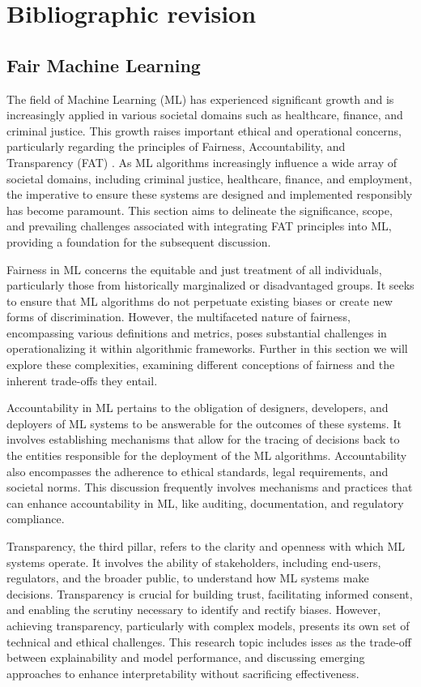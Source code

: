 
\chapter{Bibliographic revision}

\section{Fair Machine Learning}

The field of Machine Learning (ML) has experienced significant growth and is increasingly applied in various societal domains such as healthcare, finance, and criminal justice. This growth raises important ethical and operational concerns, particularly regarding the principles of Fairness, Accountability, and Transparency (FAT) \citep{}. As ML algorithms increasingly influence a wide array of societal domains, including criminal justice, healthcare, finance, and employment, the imperative to ensure these systems are designed and implemented responsibly has become paramount. This section aims to delineate the significance, scope, and prevailing challenges associated with integrating FAT principles into ML, providing a foundation for the subsequent discussion.

Fairness in ML concerns the equitable and just treatment of all individuals, particularly those from historically marginalized or disadvantaged groups\citep{}. It seeks to ensure that ML algorithms do not perpetuate existing biases or create new forms of discrimination. However, the multifaceted nature of fairness, encompassing various definitions and metrics, poses substantial challenges in operationalizing it within algorithmic frameworks. Further in this section we will explore these complexities, examining different conceptions of fairness and the inherent trade-offs they entail.

Accountability in ML pertains to the obligation of designers, developers, and deployers of ML systems to be answerable for the outcomes of these systems\citep{}. It involves establishing mechanisms that allow for the tracing of decisions back to the entities responsible for the deployment of the ML algorithms. Accountability also encompasses the adherence to ethical standards, legal requirements, and societal norms. This discussion frequently involves mechanisms and practices that can enhance accountability in ML, like auditing, documentation, and regulatory compliance.

Transparency, the third pillar, refers to the clarity and openness with which ML systems operate\citep{}. It involves the ability of stakeholders, including end-users, regulators, and the broader public, to understand how ML systems make decisions. Transparency is crucial for building trust, facilitating informed consent, and enabling the scrutiny necessary to identify and rectify biases. However, achieving transparency, particularly with complex models, presents its own set of technical and ethical challenges. This research topic includes isses as the trade-off between explainability and model performance, and discussing emerging approaches to enhance interpretability without sacrificing effectiveness.


